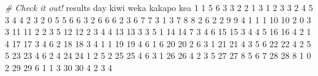 \documentclass[
]{book}
\newenvironment{Shaded}{\begin{snugshade}}{\end{snugshade}}
\newcommand{\CommentTok}[1]{\textcolor[rgb]{0.56,0.35,0.01}{\textit{#1}}}
\newcommand{\DecValTok}[1]{\textcolor[rgb]{0.00,0.00,0.81}{#1}}
\newcommand{\NormalTok}[1]{#1}
\begin{document}
\begin{Shaded}
\begin{Highlighting}[]
\CommentTok{\# Check it out!}
\NormalTok{results}
\NormalTok{   day kiwi weka kakapo kea}
\DecValTok{1}    \DecValTok{1}    \DecValTok{5}    \DecValTok{6}      \DecValTok{3}   \DecValTok{3}
\DecValTok{2}    \DecValTok{2}    \DecValTok{1}    \DecValTok{3}      \DecValTok{1}   \DecValTok{2}
\DecValTok{3}    \DecValTok{3}    \DecValTok{2}    \DecValTok{4}      \DecValTok{5}   \DecValTok{3}
\DecValTok{4}    \DecValTok{4}    \DecValTok{2}    \DecValTok{3}      \DecValTok{2}   \DecValTok{0}
\DecValTok{5}    \DecValTok{5}    \DecValTok{6}    \DecValTok{6}      \DecValTok{3}   \DecValTok{2}
\DecValTok{6}    \DecValTok{6}    \DecValTok{6}    \DecValTok{2}      \DecValTok{3}   \DecValTok{6}
\DecValTok{7}    \DecValTok{7}    \DecValTok{3}    \DecValTok{1}      \DecValTok{3}   \DecValTok{7}
\DecValTok{8}    \DecValTok{8}    \DecValTok{2}    \DecValTok{6}      \DecValTok{2}   \DecValTok{2}
\DecValTok{9}    \DecValTok{9}    \DecValTok{4}    \DecValTok{1}      \DecValTok{1}   \DecValTok{1}
\DecValTok{10}  \DecValTok{10}    \DecValTok{2}    \DecValTok{0}      \DecValTok{3}   \DecValTok{3}
\DecValTok{11}  \DecValTok{11}    \DecValTok{2}    \DecValTok{2}      \DecValTok{3}   \DecValTok{5}
\DecValTok{12}  \DecValTok{12}    \DecValTok{2}    \DecValTok{3}      \DecValTok{4}   \DecValTok{4}
\DecValTok{13}  \DecValTok{13}    \DecValTok{3}    \DecValTok{3}      \DecValTok{5}   \DecValTok{1}
\DecValTok{14}  \DecValTok{14}    \DecValTok{7}    \DecValTok{3}      \DecValTok{4}   \DecValTok{6}
\DecValTok{15}  \DecValTok{15}    \DecValTok{3}    \DecValTok{4}      \DecValTok{4}   \DecValTok{5}
\DecValTok{16}  \DecValTok{16}    \DecValTok{4}    \DecValTok{2}      \DecValTok{1}   \DecValTok{4}
\DecValTok{17}  \DecValTok{17}    \DecValTok{3}    \DecValTok{4}      \DecValTok{6}   \DecValTok{2}
\DecValTok{18}  \DecValTok{18}    \DecValTok{3}    \DecValTok{4}      \DecValTok{1}   \DecValTok{1}
\DecValTok{19}  \DecValTok{19}    \DecValTok{4}    \DecValTok{6}      \DecValTok{1}   \DecValTok{6}
\DecValTok{20}  \DecValTok{20}    \DecValTok{2}    \DecValTok{6}      \DecValTok{3}   \DecValTok{1}
\DecValTok{21}  \DecValTok{21}    \DecValTok{4}    \DecValTok{3}      \DecValTok{5}   \DecValTok{6}
\DecValTok{22}  \DecValTok{22}    \DecValTok{4}    \DecValTok{2}      \DecValTok{5}   \DecValTok{5}
\DecValTok{23}  \DecValTok{23}    \DecValTok{4}    \DecValTok{6}      \DecValTok{2}   \DecValTok{4}
\DecValTok{24}  \DecValTok{24}    \DecValTok{1}    \DecValTok{2}      \DecValTok{5}   \DecValTok{2}
\DecValTok{25}  \DecValTok{25}    \DecValTok{4}    \DecValTok{6}      \DecValTok{3}   \DecValTok{1}
\DecValTok{26}  \DecValTok{26}    \DecValTok{4}    \DecValTok{2}      \DecValTok{3}   \DecValTok{5}
\DecValTok{27}  \DecValTok{27}    \DecValTok{8}    \DecValTok{5}      \DecValTok{6}   \DecValTok{7}
\DecValTok{28}  \DecValTok{28}    \DecValTok{8}    \DecValTok{1}      \DecValTok{0}   \DecValTok{2}
\DecValTok{29}  \DecValTok{29}    \DecValTok{6}    \DecValTok{1}      \DecValTok{1}   \DecValTok{3}
\DecValTok{30}  \DecValTok{30}    \DecValTok{4}    \DecValTok{2}      \DecValTok{3}   \DecValTok{4}
\end{Highlighting}
\end{Shaded}
\end{document}
